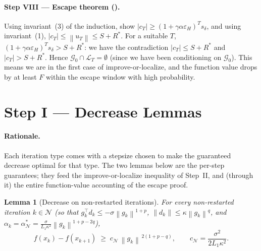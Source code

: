 \documentclass[11pt,a4paper]{article}
\theoremstyle{plain}
\newtheorem{lemma}{Lemma}
\theoremstyle{definition}
\newcommand{\norm}[1]{\left\|#1\right\|}
\newcommand{\eps}{\varepsilon}
\newcommand{\epsH}{\eps_{H}}
\newcommand{\Lone}{L_{1}}
\newcommand{\setN}{\mathcal{N}}
\newcommand{\cN}{c_{\setN}}
\newcommand{\sdel}{s_{\delta}}
\newcommand{\Rstar}{R^{*}}
\begin{document}
\paragraph{Step VIII --- Escape theorem ().}
Using invariant~(3) of the induction, show
$|c_{T}|\ge(1+\gamma\alpha\epsH)^{T}\sdel$, and using invariant~(1),
$|c_{T}|\le\norm{u_{T}}\le S+\Rstar$. For a suitable $T$,
$(1+\gamma\alpha\epsH)^{T}\sdel > S+\Rstar$: we have the contradiction
$|c_{T}|\le S+\Rstar$ and $|c_{T}|>S+\Rstar$. Hence
$\mathcal{G}_{0}\cap\mathcal{L}_{T}=\emptyset$ (since we have been conditioning on
$\mathcal{G}_{0}$). This means we are in the first case of improve-or-localize, and
the function value drops by at least $F$ within the escape window with high
probability.


\section{Step I --- Decrease Lemmas}\label{sec:decrease}

\paragraph{Rationale.}
Each iteration type comes with a stepsize chosen to make the guaranteed decrease
optimal for that type. The two lemmas below are the per-step guarantees; they feed
the improve-or-localize inequality of Step~II, and (through it) the entire
function-value accounting of the escape proof.

\begin{lemma}[Decrease on non-restarted iterations]\label{lem:decreaseN}
For every non-restarted iteration $k \in \setN$ (so that
$g_{k}^{\top}d_{k} \le -\sigma\norm{g_{k}}^{1+p}$,
$\norm{d_{k}} \le \kappa\norm{g_{k}}^{q}$, and
$\alpha_{k} = \alpha^{\ast}_{\setN} = \tfrac{\sigma}{\Lone\kappa^{2}}
\norm{g_{k}}^{1+p-2q}$),
\begin{equation}\label{eq:decreaseN}
f(x_{k}) - f(x_{k+1}) \;\geq\; \cN \, \norm{g_{k}}^{\,2(1+p-q)},
\qquad
\cN = \frac{\sigma^{2}}{2\Lone \kappa^{2}} .
\end{equation}
\end{lemma}
\end{document}
